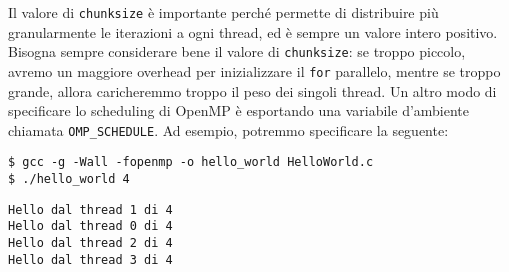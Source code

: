 Il valore di \verb|chunksize| è importante perché permette di distribuire più granularmente le iterazioni a ogni thread, ed è sempre un valore intero positivo. Bisogna sempre considerare bene il valore di \verb|chunksize|: se troppo piccolo, avremo un maggiore overhead per inizializzare il \verb|for| parallelo, mentre se troppo grande, allora caricheremmo troppo il peso dei singoli thread.
\nl
Un altro modo di specificare lo scheduling di OpenMP è esportando una variabile d'ambiente chiamata \verb|OMP_SCHEDULE|. Ad esempio, potremmo specificare la seguente:\begin{terminal}
    \begin{lstlisting}[style = notexterm]
$ gcc -g -Wall -fopenmp -o hello_world HelloWorld.c
$ ./hello_world 4
    \end{lstlisting}
    \begin{tcolorbox}
        \begin{lstlisting}[basewidth=0.44em, numbers=none]
Hello dal thread 1 di 4
Hello dal thread 0 di 4
Hello dal thread 2 di 4
Hello dal thread 3 di 4\end{lstlisting}
    \end{tcolorbox}
\end{terminal}